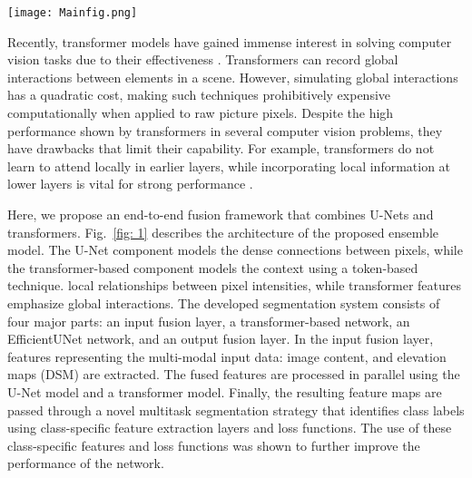 \documentclass[journal]{IEEEtran}
\begin{document}
\begin{figure*}[]
\centering
    \texttt{[image: Mainfig.png]}\
\caption{Overall model architecture. Double convolution layers apply the sequence conv.+BN+ReLU two times.}
\label{fig: 1}
\end{figure*}

Recently, transformer models have gained immense interest in solving computer vision tasks due to their effectiveness \cite{10.1145/3505244}. Transformers can record global interactions between elements in a scene. However, simulating global interactions has a quadratic cost, making such techniques prohibitively expensive computationally when applied to raw picture pixels. Despite the high performance shown by transformers in several computer vision problems, they have drawbacks that limit their capability. For example, transformers do not learn to attend locally in earlier layers, while incorporating local information at lower layers is vital for strong performance \cite{https://doi.org/10.48550/arxiv.2002.09402}. 


Here, we propose an end-to-end fusion framework that combines U-Nets and transformers. Fig.~\ref{fig: 1} describes the architecture of the proposed ensemble model. The U-Net component models the dense connections between pixels, while the transformer-based component models the context using a token-based technique. 
local relationships between pixel intensities, while transformer features emphasize global interactions. 
The developed segmentation system consists of four major parts: an input fusion layer, a transformer-based network, an EfficientUNet network, and an output fusion layer.
In the input fusion layer, features representing the multi-modal input data: image content, and elevation maps (DSM) are extracted. The fused features are processed in parallel using the U-Net model and a transformer model. Finally, the resulting feature maps are passed through a novel multitask segmentation strategy that identifies class labels using class-specific feature extraction layers and loss functions. The use of these class-specific features and loss functions was shown to further improve the performance of the network. 
\end{document}
